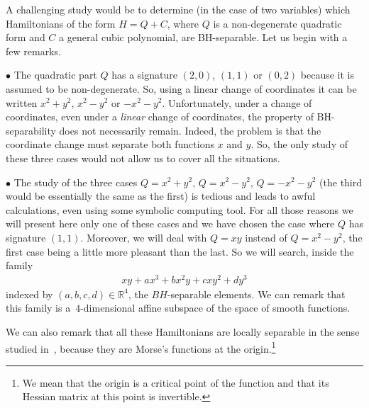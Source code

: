 \documentclass[pdftex]{sigma}%
\numberwithin{equation}{section}
\begin{document}
A challenging study would be to determine (in the case of two variables) which Hamiltonians of the form $H=Q+C$, where $Q$ is a non-degenerate quadratic form and $C$ a general cubic polynomial, are BH-separable.
Let us begin with a few remarks.



$\bullet$ The quadratic part $Q$ has a signature $(2,0)$, $(1,1)$ or $(0,2)$ because it is assumed to be non-degenerate. So, using a linear change of coordinates it can be written $x^2+y^2$, $x^2-y^2$ or $-x^2-y^2$. Unfortunately, under a change of coordinates, even under a {\it linear} change of coordinates, the property of BH-separability does not necessarily remain. Indeed, the problem is that the coordinate change must separate both functions $x$ and $y$. So, the only study of these three cases would not allow us to cover all the situations.

$\bullet$ The study of the three cases $Q=x^2+y^2$, $Q=x^2-y^2$, $Q=-x^2-y^2$ (the third would be essentially the same as the first) is tedious and leads to awful calculations, even using some symbolic computing tool. For all those reasons we will present here only one of these cases and we have chosen the case where $Q$ has signature $(1,1)$. Moreover, we will deal with $Q=xy$ instead of $Q=x^2-y^2$, the first case being a little more pleasant than the last.
So we will search, inside the family
\begin{gather*}
xy+ax^3+bx^2y+cxy^2+dy^3
\end{gather*}
indexed by $(a,b,c,d)\in\mathbb{R}^4$,
the $BH$-separable elements. We can remark that this family is a~$4$-dimensional affine subspace of the space of smooth functions.

We can also remark that all these Hamiltonians are locally separable in the sense studied in~\cite{BouBr}, because they are Morse's functions at the origin.\footnote{We mean that the origin is a critical point of the function and that its Hessian matrix at this point is invertible.}
\end{document}
